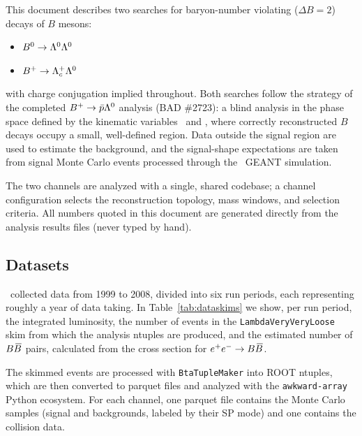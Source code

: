
This document describes two searches for baryon-number violating
($\Delta B = 2$) decays of $B$ mesons:
%
\begin{itemize}
    \item $B^0 \rightarrow \Lambda^0 \Lambda^0$
    \item $B^+ \rightarrow \Lambda_c^+ \Lambda^0$
\end{itemize}
%
with charge conjugation implied throughout. Both searches follow the
strategy of the completed $B^+ \rightarrow \bar{p} \Lambda^0$ analysis
(BAD \#2723): a blind analysis in the phase space defined by the kinematic
variables \mes\ and \DeltaE, where correctly reconstructed $B$ decays
occupy a small, well-defined region. Data outside the signal region are
used to estimate the background, and the signal-shape expectations are
taken from signal Monte Carlo events processed through the \babar\ GEANT
simulation.

The two channels are analyzed with a single, shared codebase; a channel
configuration selects the reconstruction topology, mass windows, and
selection criteria. All numbers quoted in this document are generated
directly from the analysis results files (never typed by hand).

\subsection{Datasets}

\babar\ collected data from 1999 to 2008, divided into six run periods,
each representing roughly a year of data taking. In
Table~\ref{tab:dataskims} we show, per run period, the integrated
luminosity, the number of events in the {\tt LambdaVeryVeryLoose} skim
from which the analysis ntuples are produced, and the estimated number of
$B\kern 0.18em\overline{\kern -0.18em B}{}$ pairs, calculated from the cross section for
$e^+e^- \rightarrow B\kern 0.18em\overline{\kern -0.18em B}{}$.



The skimmed events are processed with {\tt BtaTupleMaker} into ROOT
ntuples, which are then converted to parquet files and analyzed with the
{\tt awkward-array} Python ecosystem. For each channel, one parquet file
contains the Monte Carlo samples (signal and backgrounds, labeled by
their SP mode) and one contains the collision data.

